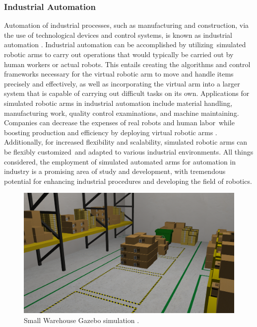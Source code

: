 \documentclass[12pt,oneside]{article}
\begin{document}
\subsubsection{Industrial Automation}
Automation of industrial processes, such as manufacturing and construction, via the use of technological devices and control systems, is known as industrial automation \cite{7_leitao2016industrial}. Industrial automation can be accomplished by utilizing simulated robotic arms to carry out operations that would typically be carried out by human workers or actual robots. This entails creating the algorithms and control frameworks necessary for the virtual robotic arm to move and handle items precisely and effectively, as well as incorporating the virtual arm into a larger system that is capable of carrying out difficult tasks on its own.
Applications for simulated robotic arms in industrial automation include material handling, manufacturing work, quality control examinations, and machine maintaining. Companies can decrease the expenses of real robots and human labor while boosting production and efficiency by deploying virtual robotic arms \cite{8_javaid2021substantial}. Additionally, for increased flexibility and scalability, simulated robotic arms can be flexibly customized and adapted to various industrial environments. All things considered, the employment of simulated automated arms for automation in industry is a promising area of study and development, with tremendous potential for enhancing industrial procedures and developing the field of robotics.

\begin{figure}[H]
\centering
\includegraphics[width=0.9\linewidth]{gazebo_city1}
\caption{Small Warehouse Gazebo simulation \cite{aws-robomaker-small-warehouse-world}.}
\label{fig:gazebocity1}
\end{figure}
\end{document}
